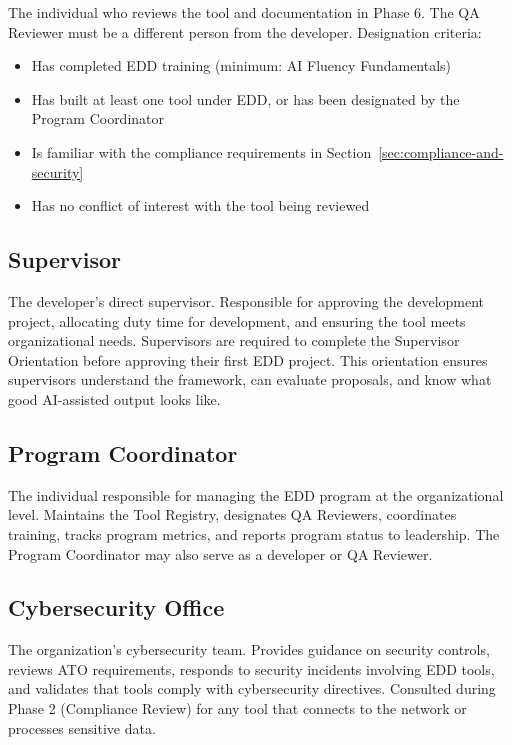 \documentclass[11pt,letterpaper]{article}
\begin{document}
The individual who reviews the tool and documentation in Phase 6. The QA Reviewer must
be a different person from the developer. Designation criteria:

\begin{itemize}
  \item Has completed EDD training (minimum: AI Fluency Fundamentals)
  \item Has built at least one tool under EDD, or has been designated by the Program Coordinator
  \item Is familiar with the compliance requirements in Section~\ref{sec:compliance-and-security}
  \item Has no conflict of interest with the tool being reviewed
\end{itemize}

\subsection{Supervisor}
\label{sec:role-supervisor}

The developer's direct supervisor. Responsible for approving the development project,
allocating duty time for development, and ensuring the tool meets organizational needs.
Supervisors are required to complete the Supervisor Orientation before approving their
first EDD project. This orientation ensures supervisors understand the framework, can
evaluate proposals, and know what good AI-assisted output looks like.

\subsection{Program Coordinator}
\label{sec:role-coordinator}

The individual responsible for managing the EDD program at the organizational level.
Maintains the Tool Registry, designates QA Reviewers, coordinates training, tracks
program metrics, and reports program status to leadership. The Program Coordinator
may also serve as a developer or QA Reviewer.

\subsection{Cybersecurity Office}
\label{sec:role-cybersecurity}

The organization's cybersecurity team. Provides guidance on security controls, reviews
ATO requirements, responds to security incidents involving EDD tools, and validates
that tools comply with cybersecurity directives. Consulted during Phase 2 (Compliance
Review) for any tool that connects to the network or processes sensitive data.
\end{document}
